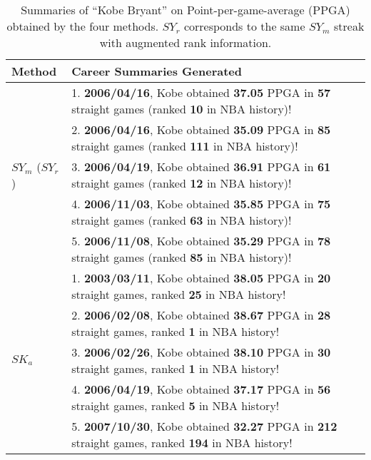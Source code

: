 \begin{table}
\caption{Summaries of ``Kobe Bryant'' on Point-per-game-average (PPGA) obtained by the four methods. $SY_r$ corresponds
to the same $SY_m$ streak with augmented rank information.}
\label{tbl:survey-case}
\centering
\begin{tabular}{|l|p{12cm}|}
\hline
\textbf{Method}          & \textbf{Career Summaries Generated                                                                                             } \\ \hline
\multirow{5}{0.5cm}{$SY_m$ ($SY_r$)} &1. \textbf{2006/04/16}, Kobe obtained \textbf{37.05} PPGA in \textbf{57} straight games (ranked \textbf{10} in NBA history)!    \\ %
						 &2. \textbf{2006/04/16}, Kobe obtained \textbf{35.09} PPGA in \textbf{85} straight games (ranked \textbf{111} in NBA history)!  \\ %
                         &3. \textbf{2006/04/19}, Kobe obtained \textbf{36.91} PPGA in \textbf{61} straight games (ranked \textbf{12} in NBA history)!   \\ %
                         &4. \textbf{2006/11/03}, Kobe obtained \textbf{35.85} PPGA in \textbf{75} straight games (ranked \textbf{63} in NBA history)!  \\ %
                         &5. \textbf{2006/11/08}, Kobe obtained \textbf{35.29} PPGA in \textbf{78} straight games (ranked \textbf{85} in NBA history)!  
\\ \hline
\multirow{5}{0.5cm}{$SK_a$}  &1. \textbf{2003/03/11}, Kobe obtained \textbf{38.05} PPGA in \textbf{20} straight games, ranked \textbf{25} in NBA history! \\ %
                         &2. \textbf{2006/02/08}, Kobe obtained \textbf{38.67} PPGA in \textbf{28} straight games, ranked \textbf{1} in NBA history!    \\ %
                         &3. \textbf{2006/02/26}, Kobe obtained \textbf{38.10} PPGA in \textbf{30} straight games, ranked \textbf{1} in NBA history! \\ %
                         &4. \textbf{2006/04/19}, Kobe obtained \textbf{37.17} PPGA in \textbf{56} straight games, ranked \textbf{5} in NBA history!  \\ %
                         &5. \textbf{2007/10/30}, Kobe obtained \textbf{32.27} PPGA in \textbf{212} straight games, ranked \textbf{194} in NBA history!                  				 					 
\\ \hline

\end{tabular}
\end{table}
